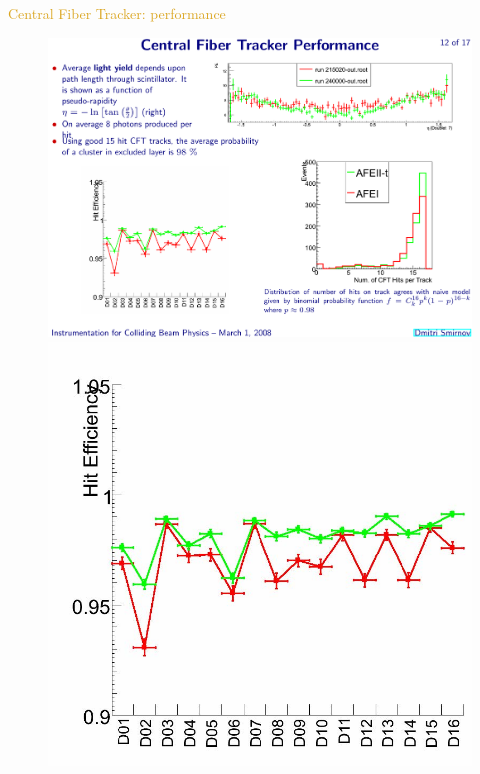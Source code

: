 \begin{frame}{\textcolor{Goldenrod}{Central Fiber Tracker: performance}}
  \begin{overlayarea}{\textwidth}{\textheight}
    \begin{figure}[h]\centering
      \includegraphics[height=0.2\textheight]{./Images/22_CFT_performance.pdf}\\
      \includegraphics[height=0.45\textheight]{./Images/23_CFT_performance}

\end{figure}
\end{overlayarea}
\end{frame}
